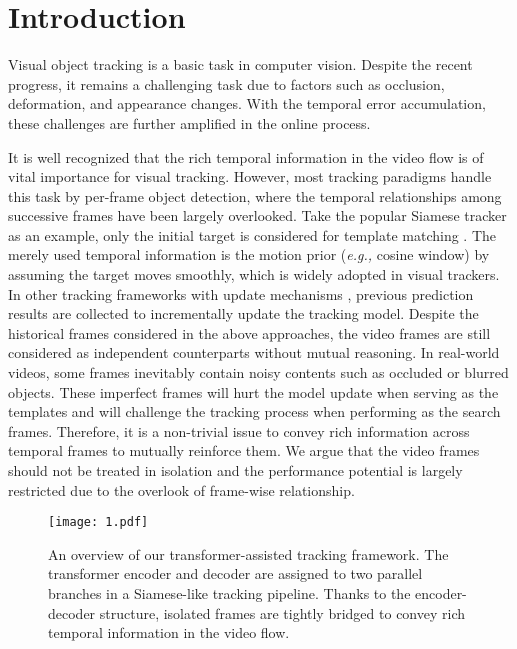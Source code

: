 \documentclass[10pt,twocolumn,letterpaper]{article}
\begin{document}
\vspace{-0.1in}
\section{Introduction}

Visual object tracking is a basic task in computer vision. Despite the recent progress, it remains a challenging task due to factors such as occlusion, deformation, and appearance changes.
With the temporal error accumulation, these challenges are further amplified in the online process.



It is well recognized that the rich temporal information in the video flow is of vital importance for visual tracking.
However, most tracking paradigms \cite{SiamRPN,siamrpn++,MAML} handle this task by per-frame object detection, where the temporal relationships among successive frames have been largely overlooked.
Take the popular Siamese tracker as an example, only the initial target is considered for template matching \cite{SiamFC,SINT,GOTURN,SiamRPN}.
The merely used temporal information is the motion prior (\emph{e.g.,} cosine window) by assuming the target moves smoothly, which is widely adopted in visual trackers.
In other tracking frameworks with update mechanisms \cite{KCF,MDNet,ECO,MemTrack,SiameseUpdate,DiMP}, previous prediction results are collected to incrementally update the tracking model.
Despite the historical frames considered in the above approaches, the video frames are still considered as independent counterparts without mutual reasoning.
In real-world videos, some frames inevitably contain noisy contents such as occluded or blurred objects.
These imperfect frames will hurt the model update when serving as the templates and will challenge the tracking process when performing as the search frames.  
Therefore, it is a non-trivial issue to convey rich information across temporal frames to mutually reinforce them.
We argue that the video frames should not be treated in isolation and the performance potential is largely restricted due to the overlook of frame-wise relationship.




\begin{figure}
	\centering
	\texttt{[image: 1.pdf]}
	\caption{An overview of our transformer-assisted tracking framework. The transformer encoder and decoder are assigned to two parallel branches in a Siamese-like tracking pipeline. Thanks to the encoder-decoder structure, isolated frames are tightly bridged to convey rich temporal information in the video flow.}\label{fig:1}
	\vspace{-0.1in}
\end{figure}
\end{document}
